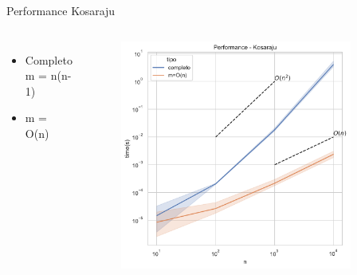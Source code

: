 \documentclass[aspectratio=169,usenames,dvipsnames]{beamer}
\begin{document}
\begin{frame}{Performance Kosaraju}
  \begin{columns}
    
    \vfill
    \begin{itemize}
      \item Completo m = n(n-1) 
      \item m = O(n)
    \end{itemize}
    \vfill


    \begin{figure}[ht]
    \centering
    \includegraphics[width=0.9\textwidth]{figs/kosaraju_time.pdf}
    \end{figure}

  \end{columns}
\end{frame}
\end{document}
